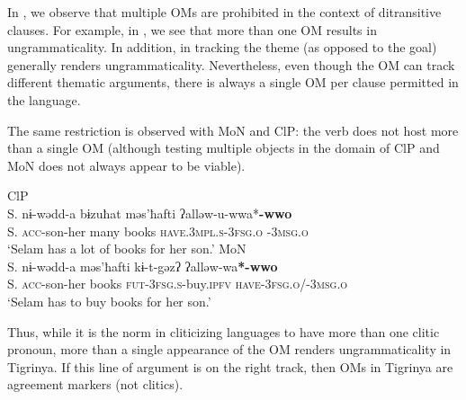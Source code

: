 \documentclass[output=paper]{langscibook}
\begin{document}
\noindent In , we observe that multiple OMs are prohibited in the context of ditransitive clauses. For example, in , we see that more than one OM results in ungrammaticality. In addition, in  tracking the theme (as opposed to the goal) generally renders ungrammaticality. Nevertheless, even though the OM can track different thematic arguments, there is always a single OM per clause permitted in the language. 

The same restriction is observed with MoN and ClP: the verb does not host more than a single OM (although testing multiple objects in the domain of ClP and MoN does not always appear to be viable).

\ea
\ea\label{ex:Gebregziabher:double4} ClP \\
\gll S. nɨ-wədd-a bɨzuħat məs'ħafti ʔalləw-u-wwa*{\textbf{-wwo}} \\
S. {\scshape acc-}son-her many books {\scshape have.3mpl.s-3fsg.o} {\scshape -3msg.o}\\
\glt `Selam has a lot of books for her son.'
\ex\label{ex:Gebregziabher:modagr4} MoN \\
\gll S. nɨ-wədd-a məs'ħafti kɨ-t-gəzʔ ʔalləw-wa{\textbf{*-wwo}} \\
S. {\scshape acc-}son-her books {\scshape fut-3fsg.s-}buy.{\scshape ipfv} {\scshape have-3fsg.o}/{\scshape -3msg.o} \\
\glt `Selam has to buy books for her son.'
\z
\z

\noindent Thus, while it is the norm in cliticizing languages to have more than one clitic pronoun, more than a single appearance of the OM renders ungrammaticality in Tigrinya. 
If this line of argument is on the right track, then OMs in Tigrinya are agreement markers (not clitics).
\end{document}
